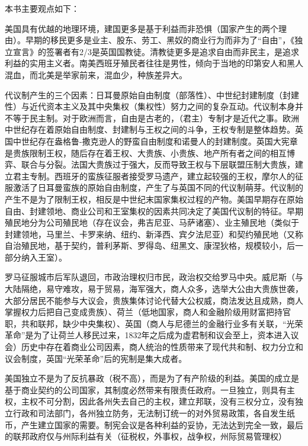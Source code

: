 本书主要观点如下：
\begin{itemize*}
    \item 美国具有优越的地理环境，建国更多是基于利益而非恐惧（国家产生的两个理由）。早期的移民更多是业主、股东、劳工、黑奴的商业行为而非为了“自由”，《独立宣言》的签署者有2/3是英国国教徒。清教徒更多是追求自由而非民主，是追求利益的实用主义者。南美西班牙殖民者往往是男性，倾向于当地的印第安人和黑人混血，而北美是举家前来，混血少，种族差异大。
    \item 代议制产生的三个因素：日耳曼原始自由制度（部落性）、中世纪封建制度（封建性）与近代资本主义及其中央集权（集权性）努力之间的复杂互动。代议制本身并不等于民主制。对于欧洲而言，自由是古老的，（君主）专制才是近代之事。欧洲中世纪存在着原始自由制度、封建制与王权之间的斗争，王权专制是整体趋势。英国中世纪存在盎格鲁-撒克逊人的野蛮自由制度和诺曼人的封建制度。英国大宪章是贵族限制王权，随后存在着王权、大贵族、小贵族、地产所有者之间的相互博弈、联合与分裂。法国大贵族过于强大，反而导致王权与下层联盟压制大贵族，建立君主专制。西班牙的蛮族征服者接受罗马遗产，建立起较强的王权，摩尔人的征服激活了日耳曼蛮族的原始自由制度，产生了与英国不同的代议制萌芽。代议制的产生不是为了限制王权，相反是中世纪末国家集权过程的产物。美国早期存在原始自由、封建领地、商业公司和王室集权的因素共同决定了美国代议制的特征。早期殖民地分为公司殖民地（存在议会，弗吉尼亚、马萨诸塞）、业主殖民地（类似于封建领地，马里兰、卡罗来纳、纽约、新泽西、宾夕法尼亚）和契约殖民地（又称自治殖民地，基于契约，普利茅斯、罗得岛、纽黑文、康涅狄格，规模较小，后一部分纳入王室）。
    \item 罗马征服城市后军队退回，市政治理权归市民，政治权交给罗马中央。威尼斯（与大陆隔绝，易守难攻，易于贸易，海军强大，商人众多，选举大公由大贵族世袭，大部分居民不能参与大议会，贵族集体讨论代替大公权威，商法发达且成熟，商人掌握权力后把自己变成贵族）、荷兰（低地国家，商人和金融阶级用财富把持官职，共和联邦，缺少中央集权）、英国（商人与尼德兰的金融行业多有关联，“光荣革命”是为了让荷兰人移民过来，1832年之后成为虚君制和议会至上，资本进入议会）历史中存在着商业公司因素，商人统治的性质带来了现代共和制、权力分立和议会制度，英国“光荣革命”后的宪制是集大成者。
    \item 美国独立不是为了反抗暴政（税不高），而是为了有产阶级的利益。美国的成立是基于商业契约的公司国家，其制度必然带来有限责任政府。一旦独立，则具有主权，主权不可分割，因此各州失去自己的主权，建立邦联，没有三权分立，没有独立行政和司法部门，各州独立防务，无法制订统一的对外贸易政策，各自发生纸币，产生建立国家的需要。制宪会议是各种利益的妥协，无法达到完全一致，最后的联邦政府仅与州际利益有关（征税权，外事权，战争权，州际贸易管理权）

\end{itemize*}
